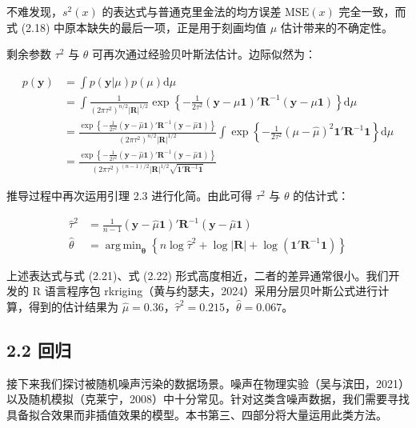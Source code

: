 \documentclass{ctexart}
\DeclareMathOperator*{\argmin}{arg\,min}
\begin{document}
不难发现，$s^2(x)$ 的表达式与普通克里金法的均方误差 $\mathrm{MSE}(x)$ 完全一致，而式 (2.18) 中原本缺失的最后一项，正是用于刻画均值 $\mu$ 估计带来的不确定性。

剩余参数 $\tau^2$ 与 $\theta$ 可再次通过经验贝叶斯法估计。边际似然为：

\begin{align*}
p(\boldsymbol{y})&=\int p(\boldsymbol{y}|\mu)p(\mu)\mathrm{d}\mu\\
&=\int\frac{1}{(2\pi\tau^2)^{n/2}|\boldsymbol{R}|^{1/2}}\exp\left\{-\frac{1}{2\tau^2}(\boldsymbol{y}-\mu\boldsymbol{1})'\boldsymbol{R}^{-1}(\boldsymbol{y}-\mu\boldsymbol{1})\right\}\mathrm{d}\mu\\
&=\frac{\exp\left\{-\frac{1}{2\tau^2}(\boldsymbol{y}-\widehat\mu\boldsymbol{1})'\boldsymbol{R}^{-1}(\boldsymbol{y}-\widehat\mu\boldsymbol{1})\right\}}{(2\pi\tau^2)^{n/2}|\boldsymbol{R}|^{1/2}}\int\exp\left\{-\frac{1}{2\tau^2}(\mu-\widehat\mu)^2\boldsymbol{1}'\boldsymbol{R}^{-1}\boldsymbol{1}\right\}\mathrm{d}\mu\\
&=\frac{\exp\left\{-\frac{1}{2\tau^2}(\boldsymbol{y}-\widehat\mu\boldsymbol{1})'\boldsymbol{R}^{-1}(\boldsymbol{y}-\widehat\mu\boldsymbol{1})\right\}}{(2\pi\tau^2)^{(n-1)/2}|\boldsymbol{R}|^{1/2}\sqrt{\boldsymbol{1}'\boldsymbol{R}^{-1}\boldsymbol{1}}}
\end{align*}

推导过程中再次运用引理 2.3 进行化简。由此可得 $\tau^2$ 与 $\theta$ 的估计式：

\begin{align*}
\widehat\tau^2&=\frac{1}{n-1}(\boldsymbol{y}-\widehat\mu\boldsymbol{1})'\boldsymbol{R}^{-1}(\boldsymbol{y}-\widehat\mu\boldsymbol{1})\tag{2.27}\\
\widehat\theta&=\argmin_{\boldsymbol{\theta}}\left\{n\log\widehat\tau^2+\log|\boldsymbol{R}|+\log(\boldsymbol{1}'\boldsymbol{R}^{-1}\boldsymbol{1})\right\}\tag{2.28}
\end{align*}

上述表达式与式 (2.21)、式 (2.22) 形式高度相近，二者的差异通常很小。我们开发的 R 语言程序包 rkriging（黄与约瑟夫，2024）采用分层贝叶斯公式进行计算，得到的估计结果为 $\widehat\mu=0.36$，$\widehat\tau^2=0.215$，$\widehat\theta=0.067$。

\subsection*{2.2 回归}

接下来我们探讨被随机噪声污染的数据场景。噪声在物理实验（吴与滨田，2021）以及随机模拟（克莱宁，2008）中十分常见。针对这类含噪声数据，我们需要寻找具备拟合效果而非插值效果的模型。本书第三、四部分将大量运用此类方法。
\end{document}
